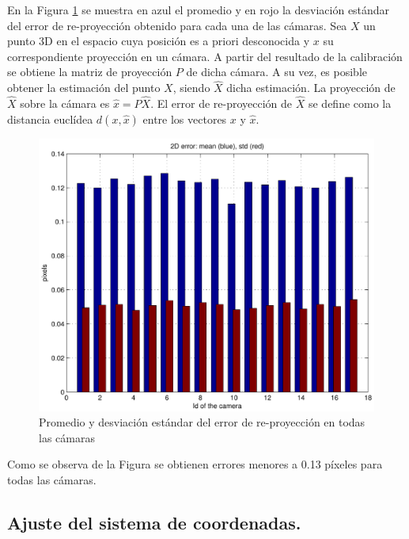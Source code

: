 En la Figura \ref{fig: error reproyeccion} se muestra en azul el promedio y en rojo la desviación estándar del error de re-proyección obtenido para cada una de las cámaras. Sea $X$ un punto 3D en el espacio cuya posición es a priori desconocida y $x$ su correspondiente proyección en un cámara. A partir del resultado de la calibración se obtiene la matriz de proyección $P$ de dicha cámara. A su vez, es posible obtener la estimación del  punto $X$, siendo $ \hat{X}$ dicha estimación. La proyección de $\hat{X}$ sobre la cámara es $\hat{x} = P \hat{X}$. El error de re-proyección de $\hat{X}$ se define como la distancia euclídea $d(x,\hat{x})$ entre los vectores $x$ y $\hat{x}$.\\

\begin{figure}[ht!]
\begin{center}
\includegraphics[scale=0.5]{img/calibracion/reprerrors.pdf}
\end{center}
\caption{Promedio y desviación estándar del error de re-proyección en todas las cámaras }
\label{fig: error reproyeccion}
\end{figure}
  
  
  Como se observa de la Figura se obtienen errores menores a 0.13 píxeles para todas las cámaras.
  
\subsection{Ajuste del sistema de coordenadas.}

